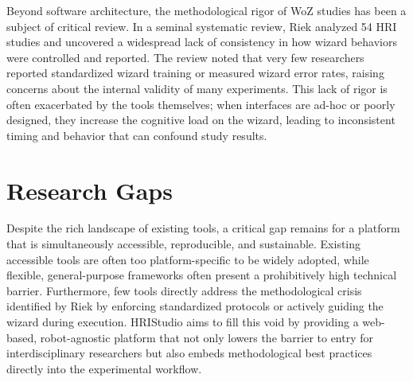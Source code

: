 Beyond software architecture, the methodological rigor of WoZ studies has been a subject of critical review. In a seminal systematic review, Riek \cite{Riek2012} analyzed 54 HRI studies and uncovered a widespread lack of consistency in how wizard behaviors were controlled and reported. The review noted that very few researchers reported standardized wizard training or measured wizard error rates, raising concerns about the internal validity of many experiments. This lack of rigor is often exacerbated by the tools themselves; when interfaces are ad-hoc or poorly designed, they increase the cognitive load on the wizard, leading to inconsistent timing and behavior that can confound study results.

\section{Research Gaps}

Despite the rich landscape of existing tools, a critical gap remains for a platform that is simultaneously accessible, reproducible, and sustainable. Existing accessible tools are often too platform-specific to be widely adopted, while flexible, general-purpose frameworks often present a prohibitively high technical barrier. Furthermore, few tools directly address the methodological crisis identified by Riek by enforcing standardized protocols or actively guiding the wizard during execution. HRIStudio aims to fill this void by providing a web-based, robot-agnostic platform that not only lowers the barrier to entry for interdisciplinary researchers but also embeds methodological best practices directly into the experimental workflow.

